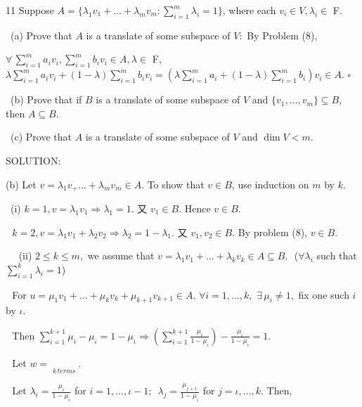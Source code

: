 \documentclass[a4paper, 11pt, UTF8]{article}
\begin{document}
\begin{large}
{\timesbf\Large 11} {\timessl\Large 
Suppose $A=\{\lambda_1 v_1+\dots+\lambda_m v_m:\sum\limits_{i=1}^m \lambda_i=1\}$, where each $v_i\in V,\lambda_i\in$ {\timesbf F}.}\par\quad\,
(a) {\timessl\Large Prove that $A$ is a translate of some subspace of $V$:\,\,\,{\large By Problem (8),}}\par\qquad\quad
$\forall\,\sum\limits_{i=1}^m a_i v_i,\sum\limits_{i=1}^m b_i v_i\in A,\lambda\in$ {\timesbf F},\quad$\lambda\sum\limits_{i=1}^m a_i v_i+(1-\lambda)\sum\limits_{i=1}^m b_i v_i=(\lambda\sum\limits_{i=1}^m a_i+(1-\lambda)\sum\limits_{i=1}^m b_i)v_i\in A.\,\,\square$\par\quad\,
(b) {\timessl\Large
Prove that if $B$ is a translate of some subspace of $V$ and $\{v_1,\dots,v_m\}\subseteq B$, then $A\subseteq B$.
}\par\quad\,
(c) {\timessl\Large
Prove that $A$ is a translate of some subspace of $V$ and $\dim V<m.$
}\par
{\timesbf S\footnotesize{OLUTION:}}\par\quad
(b) Let $v=\lambda_1 v_+\dots+\lambda_m v_m\in A$. To show that $v\in B$, use induction on $m$ by $k$.\par\qquad\,
(i) $k=1,v=\lambda_1 v_1\Rightarrow \lambda_1=1.$ 又 $v_1\in B.$ Hence $v\in B$.\par\qquad\quad\,\,
$k=2,v=\lambda_1 v_1+\lambda_2 v_2\Rightarrow\lambda_2=1-\lambda_1.$ 又 $v_1,v_2\in B.$ By problem (8), $v\in B$.\par\quad\,\,\,\,\,\,
(ii) $2\leq k\leq m,$ we assume that $v=\lambda_1 v_1+\dots+\lambda_k v_k\in A\subseteq B.$\,\, ($\forall\lambda_i$ such that $\sum\limits_{i=1}^k\lambda_i=1$)\par\qquad\quad\,\,
For $u=\mu_1 v_1+\dots+\mu_k v_k+\mu_{k+1} v_{k+1}\in A.\,\,\forall i=1,\dots,k,\,\,\exists\,\mu_i\neq 1,$ fix one such $i$ by $\iota$.\par\qquad\quad\,\,
Then $\sum\limits_{i=1}^{k+1}\mu_i-\mu_\iota=1-\mu_\iota\Rightarrow(\sum\limits_{i=1}^{k+1}\displaystyle\frac{\mu_i}{1-\mu_\iota})-\displaystyle\frac{\mu_\iota}{1-\mu_\iota}=1.$\par\qquad\quad\,\,
Let $w=\mathop{\underbrace{\displaystyle\frac{\mu_1}{1-\mu_\iota}v_1+\dots+\displaystyle\frac{\mu_{\iota-1}}{1-\mu_\iota}v_{\iota-1}+\displaystyle\frac{\mu_{\iota+1}}{1-\mu_\iota}v_{\iota+1}+\dots+\displaystyle\frac{\mu_{k+1}}{1-\mu_\iota}v_{k+1}}}\limits_{k\,terms}.$\par\qquad\quad\,\,
Let $\lambda_i=\displaystyle\frac{\mu_i}{1-\mu_\iota}$ for $i=1,\dots,\iota-1;$ \,$\lambda_j=\displaystyle\frac{\mu_{j+1}}{1-\mu_\iota}$ for $j=\iota,\dots,k$. Then,\par\qquad\quad\,\,

\end{large}
\end{document}
